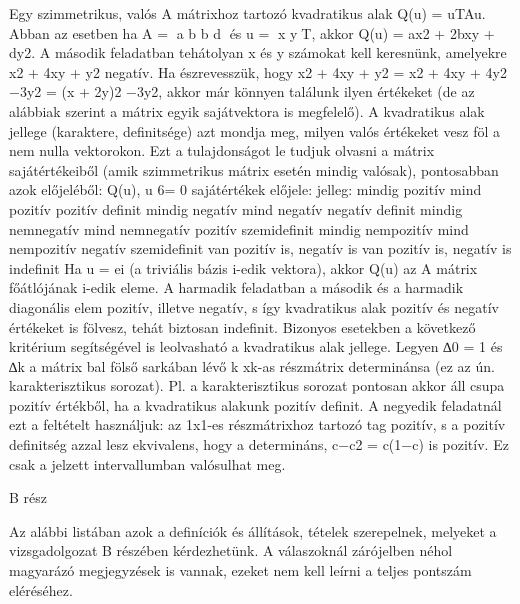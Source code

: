 \begin{frame}
  \begin{tcolorbox}[title={12/4. -N-}]
     Egy szimmetrikus, valós A mátrixhoz tartozó kvadratikus alak Q(u) = uTAu. Abban az esetben ha A = a b b d és u = x yT, akkor Q(u) = ax2 + 2bxy + dy2. A második feladatban tehátolyan x és y számokat kell keresnünk, amelyekre x2 + 4xy + y2 negatív. Ha észrevesszük, hogy x2 + 4xy + y2 = x2 + 4xy + 4y2 −3y2 = (x + 2y)2 −3y2, akkor már könnyen találunk ilyen értékeket (de az alábbiak szerint a mátrix egyik sajátvektora is megfelelő). A kvadratikus alak jellege (karaktere, deﬁnitsége) azt mondja meg, milyen valós értékeket vesz föl a nem nulla vektorokon. Ezt a tulajdonságot le tudjuk olvasni a mátrix sajátértékeiből (amik szimmetrikus mátrix esetén mindig valósak), pontosabban azok előjeléből: Q(u), u 6= 0 sajátértékek előjele: jelleg: mindig pozitív mind pozitív pozitív deﬁnit mindig negatív mind negatív negatív deﬁnit mindig nemnegatív mind nemnegatív pozitív szemideﬁnit mindig nempozitív mind nempozitív negatív szemideﬁnit van pozitív is, negatív is van pozitív is, negatív is indeﬁnit Ha u = ei (a triviális bázis i-edik vektora), akkor Q(u) az A mátrix főátlójának i-edik eleme. A harmadik feladatban a második és a harmadik diagonális elem pozitív, illetve negatív, s így kvadratikus alak pozitív és negatív értékeket is fölvesz, tehát biztosan indeﬁnit. Bizonyos esetekben a következő kritérium segítségével is leolvasható a kvadratikus alak jellege. Legyen ∆0 = 1 és ∆k a mátrix bal fölső sarkában lévő k xk-as részmátrix determinánsa (ez az ún. karakterisztikus sorozat). Pl. a karakterisztikus sorozat pontosan akkor áll csupa pozitív értékből, ha a kvadratikus alakunk pozitív deﬁnit. A negyedik feladatnál ezt a feltételt használjuk: az 1x1-es részmátrixhoz tartozó tag pozitív, s a pozitív deﬁnitség azzal lesz ekvivalens, hogy a determináns, c−c2 = c(1−c) is pozitív. Ez csak a jelzett intervallumban valósulhat meg.
  \end{tcolorbox}
\end{frame}


\begin{frame}[plain]
\begin{tcolorbox}[center, colback={myyellow}, coltext={black}, colframe={myyellow}]
    {\RHuge  B rész}
    \mmedskip
\end{tcolorbox}
\end{frame}


\begin{frame}
  \begin{tcolorbox}[title={12/4. -N-}]
     Az alábbi listában azok a deﬁníciók és állítások, tételek szerepelnek, melyeket a vizsgadolgozat B részében kérdezhetünk. A válaszoknál zárójelben néhol magyarázó megjegyzések is vannak, ezeket nem kell leírni a teljes pontszám eléréséhez.
  \end{tcolorbox}
\end{frame}

